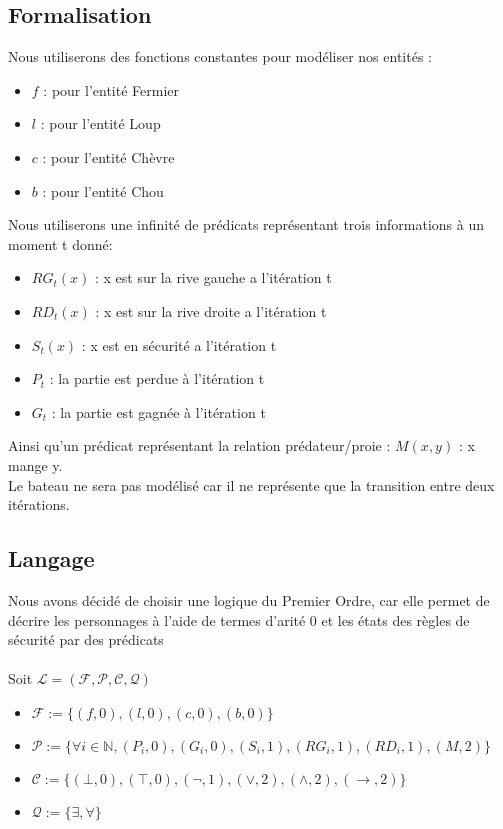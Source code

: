 \documentclass{article}
\newcommand{\N}{\mathbb{N}}
\begin{document}
\subsection{Formalisation}
Nous utiliserons des fonctions constantes pour modéliser nos entités :
\begin{itemize}
  \item $f$ : pour l’entité Fermier
  \item $l$ : pour l’entité Loup
  \item $c$ : pour l’entité Chèvre
  \item $b$ : pour l’entité Chou
\end{itemize}
Nous utiliserons une infinité de prédicats représentant trois informations à un moment t donné:
\begin{itemize}
  \item $RG_t(x)$ : x est sur la rive gauche a l’itération t
  \item $RD_t(x)$ : x est sur la rive droite a l’itération t
  \item $S_t(x)$ : x est en sécurité a l’itération t
  \item $P_t$ : la partie est perdue à l'itération t
  \item $G_t$ : la partie est gagnée à l'itération t
\end{itemize}
Ainsi qu'un prédicat représentant la relation prédateur/proie :
$M(x,y)$ : x mange y.\\
Le bateau ne sera pas modélisé car il ne représente que la transition entre deux itérations.
\subsection{Langage}
Nous avons décidé de choisir une logique du Premier Ordre, car elle permet de décrire les personnages
à l’aide de termes d’arité 0 et les états des règles de sécurité par des prédicats \\
\\
Soit $\mathcal{L} = (\mathcal{F} ,\mathcal{P} ,\mathcal{C} ,\mathcal{Q} )$
\begin{itemize}
  \item $ \mathcal{F} := \{(f,0),(l,0),(c,0),(b,0)\}$
  \item $ \mathcal{P} := \{\forall i \in \N,(P_i,0),(G_i,0),(S_i,1),(RG_i,1),(RD_i,1),(M,2)\} $
  \item $ \mathcal{C} := \{(\bot , 0),(\top , 0),(\neg , 1), (\vee , 2), (\wedge , 2), (\rightarrow , 2)\}$
  \item $ \mathcal{Q} := \{\exists, \forall \}$
\end{itemize}
\end{document}
